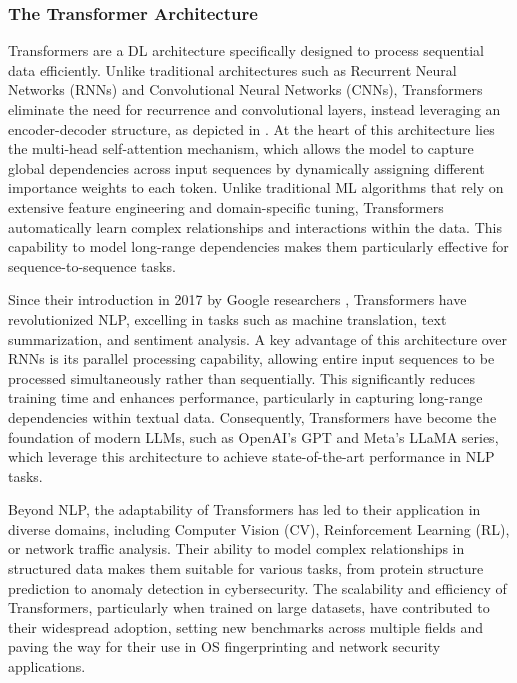 \subsubsection{The Transformer Architecture}
\label{subsubsec:transformers}

Transformers \cite{vaswani_attention_2023} are a DL architecture specifically designed to process sequential data efficiently. Unlike traditional architectures such as Recurrent Neural Networks (RNNs) and Convolutional Neural Networks (CNNs), Transformers eliminate the need for recurrence and convolutional layers, instead leveraging an encoder-decoder structure, as depicted in . At the heart of this architecture lies the multi-head self-attention mechanism, which allows the model to capture global dependencies across input sequences by dynamically assigning different importance weights to each token. Unlike traditional ML algorithms that rely on extensive feature engineering and domain-specific tuning, Transformers automatically learn complex relationships and interactions within the data. This capability to model long-range dependencies makes them particularly effective for sequence-to-sequence tasks.

Since their introduction in 2017 by Google researchers \cite{vaswani_attention_2023}, Transformers have revolutionized NLP, excelling in tasks such as machine translation, text summarization, and sentiment analysis. A key advantage of this architecture over RNNs is its parallel processing capability, allowing entire input sequences to be processed simultaneously rather than sequentially. This significantly reduces training time and enhances performance, particularly in capturing long-range dependencies within textual data. Consequently, Transformers have become the foundation of modern LLMs, such as OpenAI's GPT and Meta's LLaMA series, which leverage this architecture to achieve state-of-the-art performance in NLP tasks.

Beyond NLP, the adaptability of Transformers has led to their application in diverse domains, including Computer Vision (CV), Reinforcement Learning (RL), or network traffic analysis. Their ability to model complex relationships in structured data makes them suitable for various tasks, from protein structure prediction to anomaly detection in cybersecurity. The scalability and efficiency of Transformers, particularly when trained on large datasets, have contributed to their widespread adoption, setting new benchmarks across multiple fields and paving the way for their use in OS fingerprinting and network security applications.

